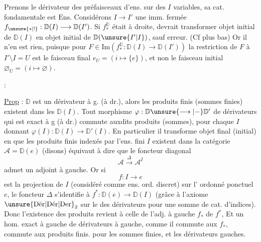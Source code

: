Prenons le dérivateur des préfaisceaux d'ens. sur des $I$ variables, sa cat. fondamentale est $\mathrm{Ens}$.  Considérons $I\longrightarrow I'$ une imm. fermée   $f_{\unsure{*|!}}:\mathbb D(I)\longrightarrow\mathbb D(I')$. Si $f_*^{\mathbb D}$ était  à droite,   devrait transformer objet initial de $\mathbb D(I)$ en objet initial de $\mathbb D(\unsure{I'|I})$, sauf erreur. (Cf plus bas) Or il n'en est rien, puisque pour  $F\in\mathrm{Im}(f_*^{\mathbb D}:\mathbb D(I)\longrightarrow\mathbb D(I'))$ la restriction de $F$ à $I'\setminus I=U$ est le faisceau final $e_U=(i\longmapsto\{e\})$, et non le faisceau initial $\varnothing_U=(i\longmapsto\varnothing)$.

 :

\uline{Prop} :  $\mathbb D$ est un dérivateur à g. (à dr.), alors les produits finis (sommes finies) existent dans les $\mathbb D(I)$. Tout  morphisme  $\varphi:\mathbb D\unsure{\longrightarrow|-}\mathbb D'$ de dérivateurs qui est exact à g (à dr.) commute auxdits produits (sommes),  pour chaque $I$ donnant $\varphi(I):\mathbb D(I)\longrightarrow\mathbb D'(I)$. En particulier il transforme objet final (initial) en 
  que les produits finis indexés par l'ens. fini $I$ existent dans la catégorie $\mathcal A=\mathbb D(e)$ (disons) équivaut à dire que le foncteur diagonal
\[
\mathcal A\xrightarrow{\Delta}\mathcal A^I
\]
admet un adjoint à gauche. Or si
\[
f:I\longrightarrow e
\]
est la projection de $I$ (considéré comme ens. ord. discret) sur  l' ordonné ponctuel $e$, le foncteur $\Delta$ s'identifie à $f^*:\mathbb D(e)\longrightarrow\mathbb D(I)$ (grâce à l'axiome $\unsure{\mathrm{D\bar er}|\mathrm{D\acute er}|\mathrm{Der}}_2$ sur le  des dérivateurs pour une somme  de cat. d'indices).
Donc l'existence des produits revient à celle de l'adj. à gauche $f_*$ de $f^*$,  Et un hom. exact à gauche de dérivateurs à gauche, comme il commute aux $f_*$, commute aux produits finis.  pour les sommes finies, et les dérivateurs gauches.

